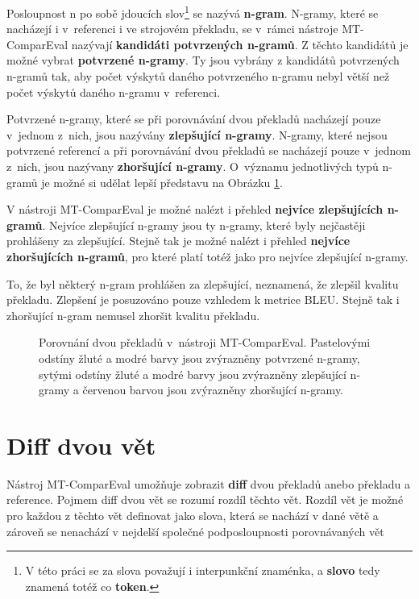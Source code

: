 Posloupnost n po sobě jdoucích slov\footnote{
  V této práci se za slova považují i interpunkční znaménka, a \textbf{slovo} tedy znamená totéž co \textbf{token}.}
  se nazývá \textbf{\mbox{n-gram}}.
N-gramy,
  které se nacházejí i v~referenci i ve strojovém překladu,
  se v~rámci nástroje \mbox{MT-ComparEval} nazývají \textbf{kandidáti potvrzených \mbox{n-gramů}}.
Z těchto kandidátů je možné vybrat \textbf{potvrzené \mbox{n-gramy}}.
Ty jsou vybrány z kandidátů potvrzených \mbox{n-gramů} tak,
  aby počet výskytů daného potvrzeného \mbox{n-gramu} nebyl větší než počet výskytů daného \mbox{n-gramu} v~referenci.

Potvrzené \mbox{n-gramy},
  které se při porovnávání dvou překladů nacházejí pouze v~jednom z~nich,
  jsou nazývány \textbf{zlepšující \mbox{n-gramy}}.
N-gramy,
  které nejsou potvrzené referencí
  a při porovnávání dvou překladů se nacházejí pouze v~jednom z~nich,
  jsou nazývany \textbf{zhoršující \mbox{n-gramy}}.
O~významu jednotlivých typů \mbox{n-gramů} je možné si udělat lepší představu na Obrázku \ref{img:n-grams}.

V nástroji \mbox{MT-ComparEval} je možné nalézt i přehled \textbf{nejvíce zlepšujících \mbox{n-gramů}}.
Nejvíce zlepšující \mbox{n-gramy} jsou ty \mbox{n-gramy},
  které byly nejčastěji prohlášeny za zlepšující.
Stejně tak je možné nalézt i přehled \textbf{nejvíce zhoršujících \mbox{n-gramů}},
  pro které platí totéž jako pro nejvíce zlepšující \mbox{n-gramy}.

To,
  že byl některý \mbox{n-gram} prohlášen za zlepšující,
  neznamená, že zlepšil kvalitu překladu.
Zlepšení je posuzováno pouze vzhledem k metrice BLEU.
Stejně tak i zhoršující \mbox{n-gram} nemusel zhoršit kvalitu překladu.

\begin{figure}
	\caption{
		Porovnání dvou překladů v~nástroji \mbox{MT-ComparEval}.
		Pastelovými odstíny žluté a modré barvy jsou zvýrazněny potvrzené \mbox{n-gramy},
		sytými odstíny žluté a modré barvy jsou zvýrazněny zlepšující \mbox{n-gramy}
		a červenou barvou jsou zvýrazněny zhoršující \mbox{n-gramy}.
	}
	\label{img:n-grams}
\end{figure}

\section{Diff dvou vět}
Nástroj \mbox{MT-ComparEval} umožňuje zobrazit \textbf{diff} dvou překladů anebo překladu a reference.
Pojmem diff dvou vět se rozumí rozdíl těchto vět.
Rozdíl vět je možné pro každou z těchto vět definovat jako slova,
  která se nachází v dané větě
  a zároveň se nenachází v nejdelší společné podposloupnosti porovnávaných vět

